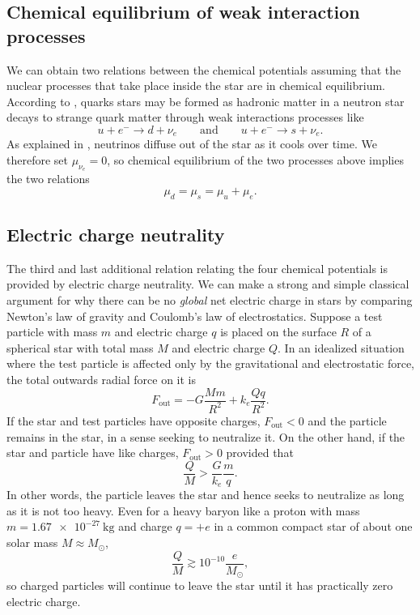 \subsection*{Chemical equilibrium of weak interaction processes}

We can obtain two relations between the chemical potentials assuming that the nuclear processes that take place inside the star are in chemical equilibrium.
According to \cite{ref:quark_star_processes}, quarks stars may be formed as hadronic matter in a neutron star decays to strange quark matter through weak interactions processes like
\begin{equation}
u + e^- \rightarrow d + \nu_e
\qquad \text{and} \qquad
u + e^- \rightarrow s + \nu_e .
\end{equation}
As explained in \cite[section 5.3]{ref:glendenning}, neutrinos diffuse out of the star as it cools over time.
We therefore set $\mu_{\nu_e}=0$, so chemical equilibrium of the two processes above implies the two relations
\begin{equation}
\mu_d = \mu_s = \mu_u + \mu_e .
\label{eq:lsm:chemical_equilibrium}
\end{equation}

\subsection*{Electric charge neutrality}

The third and last additional relation relating the four chemical potentials is provided by electric charge neutrality.
We can make a strong and simple classical argument for why there can be no \emph{global} net electric charge in stars by comparing Newton's law of gravity and Coulomb's law of electrostatics.
Suppose a test particle with mass $m$ and electric charge $q$
is placed on the surface $R$ of a spherical star with total mass $M$ and electric charge $Q$.
In an idealized situation where the test particle is affected only by the gravitational and electrostatic force, the total outwards radial force on it is
\begin{equation}
F_\text{out} = -G \frac{M m}{R^2} + k_e \frac{Q q}{R^2} .
\end{equation}
If the star and test particles have opposite charges, $F_\text{out} < 0$ and the particle remains in the star, in a sense seeking to neutralize it.
On the other hand, if the star and particle have like charges, $F_\text{out} > 0$ provided that
\begin{equation}
\frac{Q}{M} > \frac{G}{k_e} \frac{m}{q}.
\end{equation}
In other words, the particle leaves the star and hence seeks to neutralize as long as it is not too heavy.
Even for a heavy baryon like a proton with mass $m = \SI{1.67e-27}{\kilogram}$ and charge $q = +e$ in a common compact star of about one solar mass $M \approx M_\odot$,
\begin{equation}
\frac{Q}{M} \gtrsim 10^{-10} \frac{e}{M_\odot},
\end{equation}
so charged particles will continue to leave the star until it has practically zero electric charge.

